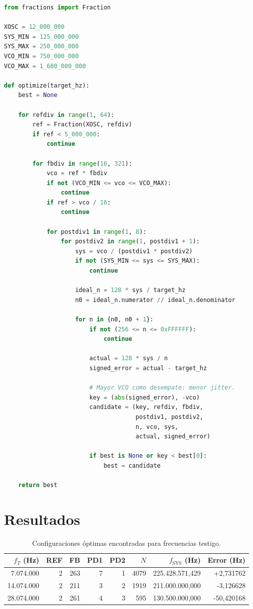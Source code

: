 \documentclass[11pt,a4paper]{article}
\begin{document}
\begin{lstlisting}[language=Python,caption={Implementación de referencia del optimizador}]
from fractions import Fraction

XOSC = 12_000_000
SYS_MIN = 125_000_000
SYS_MAX = 250_000_000
VCO_MIN = 750_000_000
VCO_MAX = 1_600_000_000

def optimize(target_hz):
    best = None

    for refdiv in range(1, 64):
        ref = Fraction(XOSC, refdiv)
        if ref < 5_000_000:
            continue

        for fbdiv in range(16, 321):
            vco = ref * fbdiv
            if not (VCO_MIN <= vco <= VCO_MAX):
                continue
            if ref > vco / 16:
                continue

            for postdiv1 in range(1, 8):
                for postdiv2 in range(1, postdiv1 + 1):
                    sys = vco / (postdiv1 * postdiv2)
                    if not (SYS_MIN <= sys <= SYS_MAX):
                        continue

                    ideal_n = 128 * sys / target_hz
                    n0 = ideal_n.numerator // ideal_n.denominator

                    for n in {n0, n0 + 1}:
                        if not (256 <= n <= 0xFFFFFF):
                            continue

                        actual = 128 * sys / n
                        signed_error = actual - target_hz

                        # Mayor VCO como desempate: menor jitter.
                        key = (abs(signed_error), -vco)
                        candidate = (key, refdiv, fbdiv,
                                     postdiv1, postdiv2,
                                     n, vco, sys,
                                     actual, signed_error)

                        if best is None or key < best[0]:
                            best = candidate

    return best
\end{lstlisting}

\section{Resultados}

\begin{table}[htbp]
\centering
\small
\caption{Configuraciones óptimas encontradas para frecuencias testigo.}
\label{tab:results}
\begin{tabular}{@{}rrrrrrrr@{}}
\toprule
\(f_T\) (Hz) & REF & FB & PD1 & PD2 & \(N\) & \(f_{\mathrm{SYS}}\) (Hz) & Error (Hz) \\
\midrule
7.074.000  & 2 & 263 & 7 & 1 & 4079 & 225.428.571,429 & +2,731762 \\
14.074.000 & 2 & 211 & 3 & 2 & 1919 & 211.000.000,000 & -3,126628 \\
28.074.000 & 2 & 261 & 4 & 3 & 595  & 130.500.000,000 & -50,420168 \\
\bottomrule
\end{tabular}
\end{table}
\end{document}
